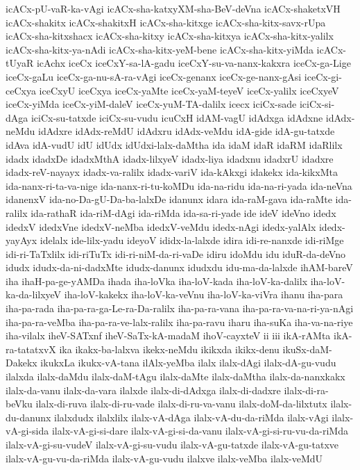 {icACx-pU-vaR-ka-vAgi
icACx-sha-katxyXM-sha-BeV-deVna
icACx-shaketxVH
icACx-shakitx
icACx-shakitxH
icACx-sha-kitxge
icACx-sha-kitx-savx-rUpa
icACx-sha-kitxshacx
icACx-sha-kitxy
icACx-sha-kitxya
icACx-sha-kitx-yalilx
icACx-sha-kitx-ya-nAdi
icACx-sha-kitx-yeM-bene
icACx-sha-kitx-yiMda
icACx-tUyaR
icAchx
iceCx
iceCxY-sa-lA-gadu
iceCxY-su-va-nanx-kakxra
iceCx-ga-Lige
iceCx-gaLu
iceCx-ga-nu-sA-ra-vAgi
iceCx-genanx
iceCx-ge-nanx-gAsi
iceCx-gi-ceCxya
iceCxyU
iceCxya
iceCx-yaMte
iceCx-yaM-teyeV
iceCx-yalilx
iceCxyeV
iceCx-yiMda
iceCx-yiM-daleV
iceCx-yuM-TA-dalilx
icecx
iciCx-sade
iciCx-si-dAga
iciCx-su-tatxde
iciCx-su-vudu
icuCxH
idAM-vagU
idAdxga
idAdxne
idAdx-neMdu
idAdxre
idAdx-reMdU
idAdxru
idAdx-veMdu
idA-gide
idA-gu-tatxde
idAva
idA-vudU
idU
idUdx
idUdxi-lalx-daMtha
ida
idaM
idaR
idaRM
idaRlilx
idadx
idadxDe
idadxMthA
idadx-lilxyeV
idadx-liya
idadxnu
idadxrU
idadxre
idadx-reV-nayayx
idadx-va-ralilx
idadx-variV
ida-kAkxgi
idakekx
ida-kikxMta
ida-nanx-ri-ta-va-nige
ida-nanx-ri-tu-koMDu
ida-na-ridu
ida-na-ri-yada
ida-neVna
idanenxV
ida-no-Da-gU-Da-ba-lalxDe
idanunx
idara
ida-raM-gava
ida-raMte
ida-ralilx
ida-rathaR
ida-riM-dAgi
ida-riMda
ida-sa-ri-yade
ide
ideV
ideVno
idedx
idedxV
idedxVne
idedxV-neMba
idedxV-veMdu
idedx-nAgi
idedx-yalAlx
idedx-yayAyx
idelalx
ide-lilx-yadu
ideyoV
ididx-la-lalxde
idira
idi-re-nanxde
idi-riMge
idi-ri-TaTxlilx
idi-riTuTx
idi-ri-niM-da-ri-vaDe
idiru
idoMdu
idu
iduR-da-deVno
idudx
idudx-da-ni-dadxMte
idudx-danunx
idudxdu
idu-ma-da-lalxde
ihAM-bareV
iha
ihaH-pa-ge-yAMDa
ihada
iha-loVka
iha-loV-kada
iha-loV-ka-dalilx
iha-loV-ka-da-lilxyeV
iha-loV-kakekx
iha-loV-ka-veVnu
iha-loV-ka-viVra
ihanu
iha-para
iha-pa-rada
iha-pa-ra-ga-Le-ra-Da-ralilx
iha-pa-ra-vana
iha-pa-ra-va-na-ri-ya-nAgi
iha-pa-ra-veMba
iha-pa-ra-ve-lalx-ralilx
iha-pa-ravu
iharu
iha-suKa
iha-va-na-riye
iha-vilalx
iheV-SATxnf
iheV-SaTx-kA-madaM
ihoV-cayxteV
ii
iii
ikA-rAMta
ikA-ra-tatatxvX
ika
ikakx-ba-lalxva
ikekx-neMdu
ikikxda
ikikx-denu
ikuSx-daM-Dakekx
ikukxLa
ikukx-vA-tana
ilAlx-yeMba
ilalx
ilalx-dAgi
ilalx-dA-gu-vudu
ilalxda
ilalx-daMdu
ilalx-daM-tAgu
ilalx-daMte
ilalx-daMtha
ilalx-da-nanxkakx
ilalx-da-vanu
ilalx-da-vara
ilalxde
ilalx-di-dAdxga
ilalx-di-dadxre
ilalx-di-ra-beVku
ilalx-di-ruva
ilalx-di-ru-vade
ilalx-di-ru-va-vanu
ilalx-doM-da-lilxtutx
ilalx-du-danunx
ilalxdudx
ilalxlilx
ilalx-vA-dAga
ilalx-vA-du-da-riMda
ilalx-vAgi
ilalx-vA-gi-sida
ilalx-vA-gi-si-dare
ilalx-vA-gi-si-da-vanu
ilalx-vA-gi-si-ru-vu-da-riMda
ilalx-vA-gi-su-vudeV
ilalx-vA-gi-su-vudu
ilalx-vA-gu-tatxde
ilalx-vA-gu-tatxve
ilalx-vA-gu-vu-da-riMda
ilalx-vA-gu-vudu
ilalxve
ilalx-veMba
ilalx-veMdU
}
